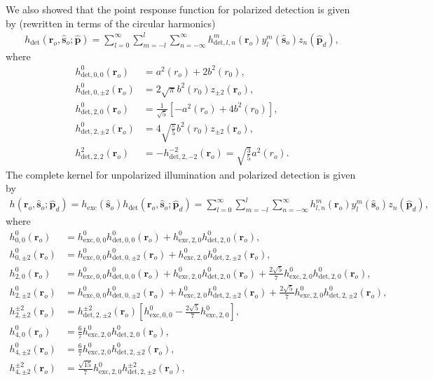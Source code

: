 \documentclass[11pt]{article}
\providecommand{\ro}[1]{\mathbf{\mathbf{r}}_o}
\providecommand{\so}[1]{\mathbf{\hat{s}}_o}
\providecommand{\mh}[1]{\mathbf{\hat{#1}}}
\begin{document}
We also showed that the point response function for polarized detection is given
by (rewritten in terms of the circular harmonics)
\begin{align}
  h_{\text{det}}(\ro{}, \so{}; \mh{p}) = \sum_{l=0}^{\infty}\sum_{m=-l}^l\sum_{n=-\infty}^{\infty} h_{\text{det},l,n}^m(\ro{})y_l^m(\so{})z_n(\mh{p}_d), 
\end{align}
where
\begin{align}
  h_{\text{det},0,0}^0(\ro{}) &= a^2(r_o) + 2b^2(r_0),\\
  h_{\text{det},0,\pm 2}^0(\ro{}) &= 2\sqrt{\pi} b^2(r_0)z_{\pm 2}(\ro{}),\\
  h_{\text{det},2,0}^0(\ro{}) &= \frac{1}{\sqrt{5}}\left[-a^2(r_o) + 4b^2(r_0)\right],\\
  h_{\text{det},2,\pm 2}^0(\ro{}) &= 4\sqrt{\frac{\pi}{5}}b^2(r_0)z_{\pm 2}(\ro{}),\\
  h_{\text{det},2,2}^2(\ro{}) &= -h_{\text{det},2,-2}^{-2}(\ro{}) = \sqrt{\frac{3}{5}}a^2(r_o).
\end{align}
The complete kernel for unpolarized illumination and polarized detection is given by
\begin{align}
  h(\ro{}, \so{}; \mh{p}_d) = h_{\text{exc}}(\so{})h_{\text{det}}(\ro{}, \so{}; \mh{p}_d) = \sum_{l=0}^{\infty}\sum_{m=-l}^l\sum_{n=-\infty}^{\infty} h_{l,n}^m(\ro{})y_l^m(\so{})z_n(\mh{p}_d), 
\end{align}
where
\begin{align}
  h_{0,0}^0(\ro{}) &= h_{\text{exc},0,0}^0 h_{\text{det},0,0}^0(\ro{}) + h_{\text{exc},2,0}^0 h_{\text{det},2,0}^0(\ro{}),\\
  h_{0,\pm 2}^0(\ro{}) &= h_{\text{exc},0,0}^0 h_{\text{det},0,\pm 2}^0(\ro{}) + h_{\text{exc},2,0}^0 h_{\text{det},2,\pm 2}^0(\ro{}),\\
  h_{2,0}^0(\ro{}) &= h_{\text{exc},0,0}^0 h_{\text{det},0,0}^0(\ro{}) + h_{\text{exc},2,0}^0 h_{\text{det},2,0}^0(\ro{}) + \frac{2\sqrt{5}}{7}h_{\text{exc},2,0}^0h_{\text{det},2,0}^0(\ro{}),\\
  h_{2,\pm 2}^0(\ro{}) &= h_{\text{exc},0,0}^0 h_{\text{det},0,\pm 2}^0(\ro{}) + h_{\text{exc},2,0}^0 h_{\text{det},2,\pm 2}^0(\ro{}) + \frac{2\sqrt{5}}{7}h_{\text{exc},2,0}^0h_{\text{det},2,\pm 2}^0(\ro{}),\\
  h_{2,\pm 2}^{\pm 2}(\ro{}) &= h_{\text{det},2,\pm 2}^{\pm 2}(\ro{})\left[h_{\text{exc},0,0}^0 - \frac{2\sqrt{5}}{7}h_{\text{exc},2,0}^0\right],\\
  h_{4,0}^0(\ro{}) &= \frac{6}{7}h_{\text{exc},2,0}^0h_{\text{det},2,0}^0(\ro{}),\\
  h_{4,\pm 2}^0(\ro{}) &= \frac{6}{7}h_{\text{exc},2,0}^0h_{\text{det},2,\pm 2}^0(\ro{}),\\
  h_{4,\pm 2}^{\pm 2}(\ro{}) &= \frac{\sqrt{15}}{7}h_{\text{exc},2,0}^0h_{\text{det},2,\pm 2}^{\pm 2}(\ro{}),
\end{align}
\end{document}
